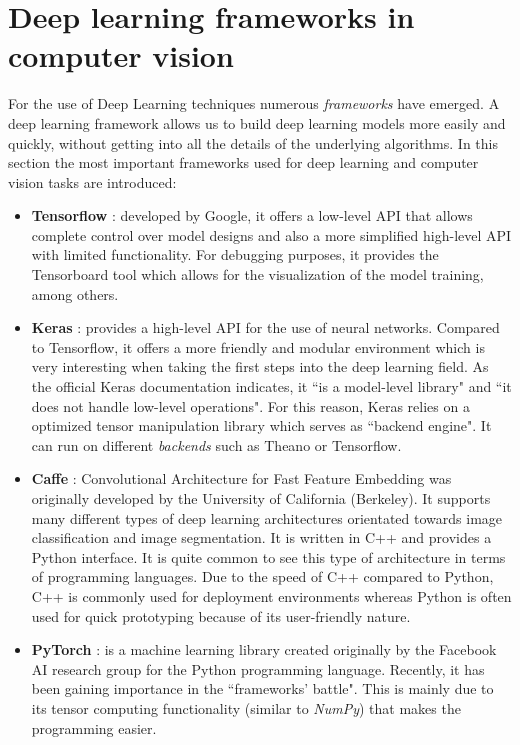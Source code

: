 \section{Deep learning frameworks in computer vision}
For the use of Deep Learning techniques numerous \textit{frameworks} have emerged. A deep learning framework allows us to build deep learning models more easily and quickly, without getting into all the details of the underlying algorithms. In this section the most important frameworks used for deep learning and computer vision tasks are introduced:
\begin{itemize}
\item \textbf{Tensorflow} \cite{tensorflow}: developed by Google, it offers a low-level API that allows complete control over model designs and also a more simplified high-level API with limited functionality. For debugging purposes, it provides the Tensorboard tool which allows for the visualization of the model training, among others.
\item \textbf{Keras} \cite{keras}: provides a high-level API for the use of neural networks. Compared to Tensorflow, it offers a more friendly and modular environment which is very interesting when taking the first steps into the deep learning field. As the official Keras documentation indicates, it ``is a model-level library" and ``it does not handle low-level operations". For this reason, Keras relies on a optimized tensor manipulation library which serves as ``backend engine". It can run on different \textit{backends} such as Theano or Tensorflow.
\item \textbf{Caffe} \cite{caffe}: Convolutional Architecture for Fast Feature Embedding was originally developed by the University of California (Berkeley). It supports many different types of deep learning architectures orientated towards image classification and image segmentation. It is written in C++ and provides a Python interface. It is quite common to see this type of architecture in terms of programming languages. Due to the speed of C++ compared to Python, C++ is commonly used for deployment environments whereas Python is often used for quick prototyping because of its user-friendly nature.
\item \textbf{PyTorch} \cite{pytorch}: is a machine learning library created originally by the Facebook AI research group for the Python programming language. Recently, it has been gaining importance in the ``frameworks' battle". This is mainly due to its tensor computing functionality (similar to \textit{NumPy}) that makes the programming easier.
\end{itemize}




